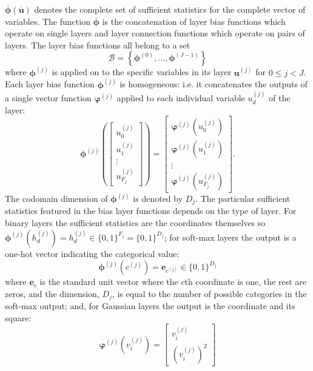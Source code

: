 \documentclass{article} %
\begin{document}
$\overline{\boldsymbol{\phi}}(\overline{\mathbf{u}})$ denotes the complete set of sufficient statistics
for the complete vector of variables.  The function $\overline{\boldsymbol{\phi}}$ is the concatenation of 
layer bias functions which operate on single layers and layer connection functions which operate on pairs of layers.
The layer bias functions all belong to a set
\begin{equation}
\mathcal{B} = \left\{\boldsymbol{\phi}^{(0)},\ldots,\boldsymbol{\phi}^{(J-1)}\right\}
\end{equation}
where $\boldsymbol{\phi}^{(j)}$ is applied on to the specific variables in its layer $\mathbf{u}^{(j)}$ for
$0\leq j<J$. Each layer bias function $\boldsymbol{\phi}^{(j)}$ is homogeneous: i.e. it concatenates the outputs of a single vector
function $\boldsymbol{\varphi}^{(j)}$
applied to each individual variable $u^{(j)}_d$ of the layer:
\begin{equation}
\boldsymbol{\phi}^{(j)}\left(\begin{bmatrix}u^{(j)}_0 \\ u^{(j)}_1 \\ \vdots \\ u^{(j)}_{F_j}\end{bmatrix}\right) = 
\begin{bmatrix} \boldsymbol{\varphi}^{(j)}(u^{(j)}_0) \\ \boldsymbol{\varphi}^{(j)}(u^{(j)}_1) \\ \vdots \\ \boldsymbol{\varphi}^{(j)}(u^{(j)}_{F_j})\end{bmatrix}.
\end{equation}  The codomain dimension of $\boldsymbol{\phi}^{(j)}$ is denoted by $D_j$.
The particular sufficient statistics featured in the bias layer functions depends on the type of layer.  For binary layers
the sufficient statistics are the coordinates themselves so $\boldsymbol{\phi}^{(j)}(h^{(j)}_d)=h^{(j)}_d\in \{0,1\}^{F_j}=\{0,1\}^{D_j}$;
for soft-max layers the output is a one-hot vector indicating the categorical value:
\begin{equation}
\boldsymbol{\phi}^{(j)}(c^{(j)})=\mathbf{e}_{c^{(j)}}\in \{0,1\}^{D_j}
\end{equation} 
where $\mathbf{e}_c$ is the standard unit vector where the $c$th coordinate is one, the rest are zeros, and the dimension,
$D_j$, is equal to the number of possible categories in the soft-max output;
and, for Gaussian layers the output is the coordinate
and its square: 
\begin{equation}
\boldsymbol{\varphi}^{(j)}(v^{(j)}_i)=\begin{bmatrix} v^{(j)}_i \\ (v^{(j)}_i)^2  \end{bmatrix}
\end{equation}
\end{document}
